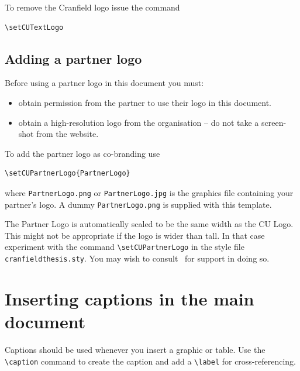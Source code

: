 \documentclass[12pt,oneside]{book} %
\begin{document}
To remove the Cranfield logo issue the command
\begin{verbatim}
\setCUTextLogo
\end{verbatim}

\subsection{Adding a partner logo}
\label{sec:UsePartnerLogo}
Before using a partner logo in this document you must:
\begin{itemize}
\item obtain permission from the partner to use their logo in this document.
\item obtain a high-resolution logo from the organisation – do not take a screen-shot from the website.
\end{itemize}
To add the partner logo as co-branding use
\begin{verbatim}
\setCUPartnerLogo{PartnerLogo}
\end{verbatim}
where \verb#PartnerLogo.png# or \verb#PartnerLogo.jpg# is the graphics file containing your partner's logo. A dummy \verb#PartnerLogo.png# is supplied with this template.

The Partner Logo is automatically scaled to be the same width as the CU Logo. This might not be appropriate if the logo is wider than tall. In that case experiment with the command \verb#\setCUPartnerLogo# in the style file \verb#cranfieldthesis.sty#. You may wish to consult~\cite{carlisle_ctan_2021,the_latex_project_team_ctan_2022} for support in doing so.

\section{Inserting captions in the main document}
Captions should be used whenever you insert a graphic or table. Use the \verb#\caption# command to create the caption and add a \verb#\label# for cross-referencing. 
\end{document}
